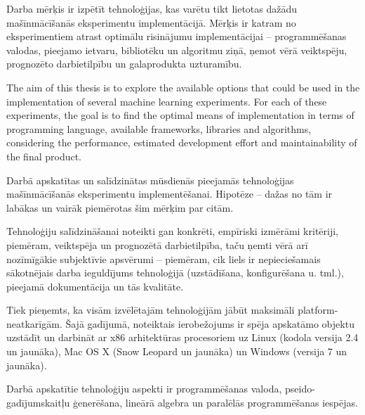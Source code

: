 \documentclass{ludis}
\begin{document}
\maketitle

\begin{abstract-lv}
  Darba mērķis ir izpētīt tehnoloģijas, kas varētu tikt lietotas dažādu mašīnmācīšanās eksperimentu implementācijā. Mērķis ir katram no eksperimentiem atrast optimālu risinājumu implementācijai -- programmēšanas valodas, pieejamo ietvaru, bibliotēku un algoritmu ziņā, ņemot vērā veiktspēju, prognozēto darbietilpību un galaprodukta uzturamību.
\end{abstract-lv}

\begin{abstract-en}
  The aim of this thesis is to explore the available options that could be used in the implementation of several machine learning experiments. For each of these experiments, the goal is to find the optimal means of implementation in terms of programming language, available frameworks, libraries and algorithms, considering the performance, estimated development effort and maintainability of the final product.
\end{abstract-en}

\tableofcontents

Darbā apskatītas un salīdzinātas mūsdienās pieejamās tehnoloģijas mašīnmācīšanās eksperimentu implementēšanai. Hipotēze -- dažas no tām ir labākas un vairāk piemērotas šim mērķim par citām.

Tehnoloģiju salīdzināšanai noteikti gan konkrēti, empīriski izmērāmi kritēriji, piemēram, veiktspēja un prognozētā darbietilpība, taču ņemti vērā arī nozīmīgākie subjektīvie apsvērumi -- piemēram, cik liels ir nepieciešamais sākotnējais darba ieguldījums tehnoloģijā (uzstādīšana, konfigurēšana u. tml.), pieejamā dokumentācija un tās kvalitāte.

Tiek pieņemts, ka visām izvēlētajām tehnoloģijām jābūt maksimāli platform-neatkarīgām. Šajā gadījumā, noteiktais ierobežojums ir spēja apskatāmo objektu uzstādīt un darbināt ar x86 arhitektūras procesoriem uz Linux (kodola versija 2.4 un jaunāka), Mac OS X (Snow Leopard un jaunāka) un Windows (versija 7 un jaunāka).

Darbā apskatītie tehnoloģiju aspekti ir programmēšanas valoda, pseido-gadījumskaitļu ģenerēšana, lineārā algebra un paralēlās programmēšanas iespējas.
\end{document}
